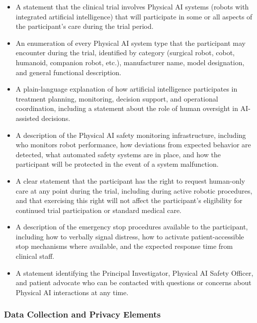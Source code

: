 \begin{itemize}
    \item A statement that the clinical trial involves Physical AI systems
    (robots with integrated artificial intelligence) that will participate in
    some or all aspects of the participant's care during the trial period.

    \item An enumeration of every Physical AI system type that the participant
    may encounter during the trial, identified by category (surgical robot,
    cobot, humanoid, companion robot, etc.), manufacturer name, model
    designation, and general functional description.

    \item A plain-language explanation of how artificial intelligence
    participates in treatment planning, monitoring, decision support, and
    operational coordination, including a statement about the role of human
    oversight in AI-assisted decisions.

    \item A description of the Physical AI safety monitoring infrastructure,
    including who monitors robot performance, how deviations from expected
    behavior are detected, what automated safety systems are in place, and
    how the participant will be protected in the event of a system malfunction.

    \item A clear statement that the participant has the right to request
    human-only care at any point during the trial, including during active
    robotic procedures, and that exercising this right will not affect the
    participant's eligibility for continued trial participation or standard
    medical care.

    \item A description of the emergency stop procedures available to the
    participant, including how to verbally signal distress, how to activate
    patient-accessible stop mechanisms where available, and the expected
    response time from clinical staff.

    \item A statement identifying the Principal Investigator, Physical AI
    Safety Officer, and patient advocate who can be contacted with questions
    or concerns about Physical AI interactions at any time.
\end{itemize}


\subsubsection{Data Collection and Privacy Elements}

